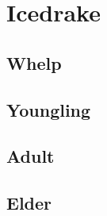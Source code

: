 \section{Icedrake}

\subsection{Whelp}

\subsection{Youngling}

\subsection{Adult}

\subsection{Elder}